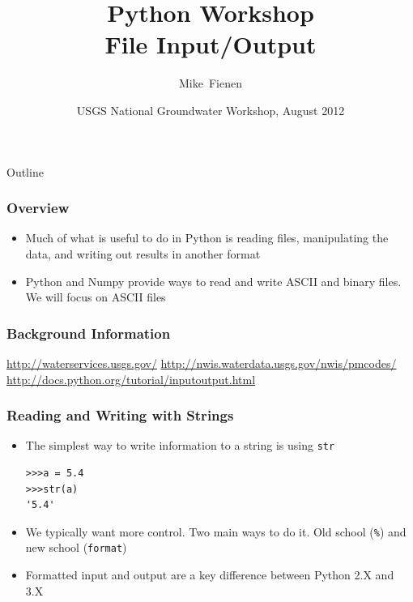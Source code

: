 \documentclass{beamer}
\title[]{Python Workshop\\
File Input/Output}
\author[Fienen] %
{Mike~Fienen}
\institute[USGS] %
{
  U.S. Geological Survey\\
  Wisconsin Water Science Center, Middleton, Wisconsin USA
  }
\date[UQ12] %
{USGS National Groundwater Workshop, August 2012}
\begin{document}
\begin{frame}
  \titlepage
\end{frame}

\begin{frame}{Outline}
\tableofcontents
\end{frame}

\begin{frame}[fragile]
\frametitle{Overview}
\begin{itemize}

\item Much of what is useful to do in Python is reading files, manipulating the data, and writing out results in another format
\item Python and Numpy provide ways to read and write ASCII and binary files. We will focus on ASCII files
\end{itemize}
\end{frame}

\begin{frame}[fragile]
\frametitle{Background Information}
\url{http://waterservices.usgs.gov/}
\url{http://nwis.waterdata.usgs.gov/nwis/pmcodes/}
\url{http://docs.python.org/tutorial/inputoutput.html}
\end{frame}


\begin{frame}[fragile]
\frametitle{Reading and Writing with Strings}
\begin{itemize}
\item The simplest way to write information to a string is using \texttt{str}
\begin{lstlisting}
>>>a = 5.4
>>>str(a)
'5.4'
\end{lstlisting}
\item We typically want more control. Two main ways to do it. Old school (\texttt{\%}) and new school (\texttt{format})
\item Formatted input and output are a key difference between Python 2.X and 3.X

\end{itemize}
\end{frame}
\end{document}
